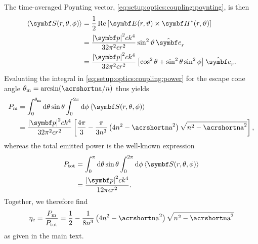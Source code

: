 The time-averaged Poynting vector, \cref{eq:setup:optics:coupling:poynting}, is then
\begin{equation}
    \begin{split}
        \expval{\bvec{S}(r, \theta, \phi)} &= \frac{1}{2}\re\left[\bvec{E}(r, \vartheta)\times\bvec{H}^{\ast}(r, \vartheta)\right] \\
                                           &= \frac{\abs{\bvec{p}}^2 c k^4}{32\pi^2\epsilon r^2}\sin^2\vartheta \,\ubvec{r} \\
                                           &= \frac{\abs{\bvec{p}}^2 c k^4}{32\pi^2\epsilon r^2}\left[\cos^2\theta + \sin^2\theta\sin^2\phi\right] \ubvec{r}.
    \end{split}
\end{equation}
Evaluating the integral in \cref{eq:setup:optics:coupling:power} for the escape cone angle $\theta_{\mr{m}} = \arcsin(\NA/n)$ thus yields
\begin{equation}
    \begin{split}
        P_{\mr{m}} &= \int_{0}^{\theta_{\mr{m}}}\dd{\theta}\sin\theta\int_{0}^{2\pi}\dd{\phi}\expval{\bvec{S}(r, \theta, \phi)} \\
                   &= \frac{\abs{\bvec{p}}^2 c k^4}{32\pi^2\epsilon r^2}\left[\frac{4\pi}{3} - \frac{\pi}{3 n^3} \left(4n^2 - \NA^2\right)\sqrt{n^2 - \NA^2}\right],
    \end{split}
\end{equation}
whereas the total emitted power is the well-known expression
\begin{equation}
    \begin{split}
        P_{\mr{tot}} &= \int_{0}^{\pi}\dd{\theta}\sin\theta\int_{0}^{2\pi}\dd{\phi}\expval{\bvec{S}(r, \theta, \phi)} \\
                     &= \frac{\abs{\bvec{p}}^2 c k^4}{12\pi\epsilon r^2}.
    \end{split}
\end{equation}
Together, we therefore find
\begin{equation}
    \eta_{\mr{c}} = \frac{P_{\mr{m}}}{P_{\mr{tot}}} = \frac{1}{2} - \frac{1}{8 n^3} \left(4n^2 - \NA^2\right)\sqrt{n^2 - \NA^2}
\end{equation}
as given in the main text.

